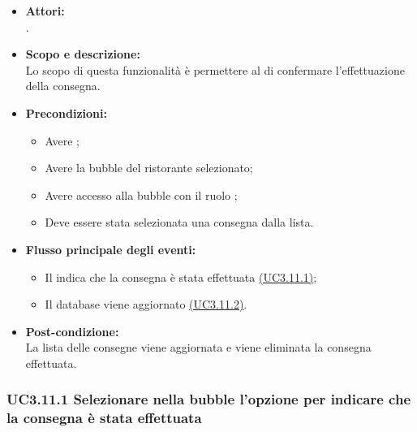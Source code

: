 \begin{itemize}
	\item \textbf{Attori:}
	\\.
	\item \textbf{Scopo e descrizione:} 
	\\Lo scopo di questa funzionalità è permettere al  di confermare l’effettuazione della consegna.
	\item \textbf{Precondizioni:}
	\begin{itemize}
		\item Avere ;
		\item Avere la bubble del ristorante selezionato;
		\item Avere accesso alla bubble con il ruolo ;
		\item Deve essere stata selezionata una consegna dalla lista.
	\end{itemize}
	\item \textbf{Flusso principale degli eventi:}
	\begin{itemize}
		\item Il  indica che la consegna è stata effettuata \hyperref[UC3.11.1]{(UC3.11.1)};
		\item Il database viene aggiornato \hyperref[UC3.11.2]{(UC3.11.2)}.
	\end{itemize}
	\item \textbf{Post-condizione:}
	\\La lista delle consegne viene aggiornata e viene eliminata la consegna effettuata.
\end{itemize}

\subsubsection{UC3.11.1 Selezionare nella bubble l’opzione per indicare che la consegna è stata effettuata} \label{UC3.11.1}

